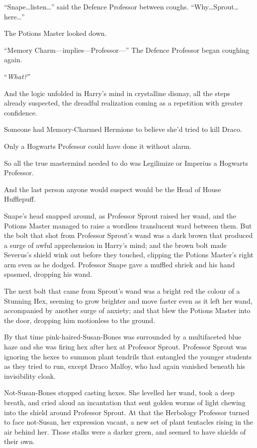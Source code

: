 “Snape…listen…” said the Defence Professor between coughs.
“Why…Sprout…here…”

The Potions Master looked down.

“Memory Charm—implies—Professor—” The Defence Professor began coughing again.

“\emph{What?}”

And the logic unfolded in Harry’s mind in crystalline dismay, all the steps already suspected, the dreadful realization coming as a repetition with greater confidence.

Someone had Memory-Charmed Hermione to believe she’d tried to kill Draco.

Only a Hogwarts Professor could have done it without alarm.

So all the true mastermind needed to do was Legilimize or Imperius a Hogwarts Professor.

And the last person anyone would suspect would be the Head of House Hufflepuff.

Snape’s head snapped around, as Professor Sprout raised her wand, and the Potions Master managed to raise a wordless translucent ward between them. But the bolt that shot from Professor Sprout’s wand was a dark brown that produced a surge of awful apprehension in Harry’s mind; and the brown bolt made Severus’s shield wink out before they touched, clipping the Potions Master’s right arm even as he dodged. Professor Snape gave a muffled shriek and his hand spasmed, dropping his wand.

The next bolt that came from Sprout’s wand was a bright red the colour of a Stunning Hex, seeming to grow brighter and move faster even as it left her wand, accompanied by another surge of anxiety; and that blew the Potions Master into the door, dropping him motionless to the ground.

By that time pink-haired-Susan-Bones was surrounded by a multifaceted blue haze and she was firing hex after hex at Professor Sprout. Professor Sprout was ignoring the hexes to summon plant tendrils that entangled the younger students as they tried to run, except Draco Malfoy, who had again vanished beneath his invisibility cloak.

Not-Susan-Bones stopped casting hexes. She levelled her wand, took a deep breath, and cried aloud an incantation that sent golden worms of light chewing into the shield around Professor Sprout. At that the Herbology Professor turned to face not-Susan, her expression vacant, a new set of plant tentacles rising in the air behind her. Those stalks were a darker green, and seemed to have shields of their own.

